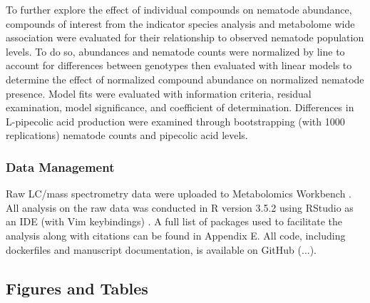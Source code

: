 \documentclass[9pt,lineno]{elife}
\begin{document}
To further explore the effect of individual compounds on nematode abundance, compounds of interest from the indicator species analysis and metabolome wide association were evaluated for their relationship to observed nematode population levels.  To do so, abundances and nematode counts were normalized by line to account for differences between genotypes then evaluated with linear models to determine the effect of normalized compound abundance on normalized nematode presence. Model fits were evaluated with information criteria, residual examination, model significance, and coefficient of determination.  Differences in L-pipecolic acid production were examined through bootstrapping (with 1000 replications) nematode counts and pipecolic acid levels.  


\subsubsection{Data Management}

Raw LC/mass spectrometry data were uploaded to Metabolomics Workbench \citep{sud2015metabolomics}.  All analysis on the raw data was conducted in R version 3.5.2 using RStudio as an IDE (with Vim keybindings) \cite{rcore2018,rstudio}.  A full list of packages used to facilitate the analysis along with citations can be found in Appendix E.  All code, including dockerfiles and manuscript documentation, is available on GitHub (...).  



\subsection{Figures and Tables}
\end{document}
